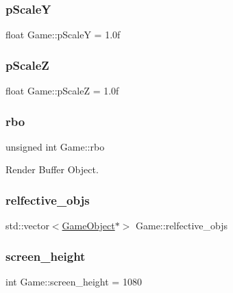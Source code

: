 \subsubsection{\texorpdfstring{pScaleY}{pScaleY}}
{\footnotesize\ttfamily float Game\+::p\+ScaleY = 1.\+0f}

\mbox{\label{class_game_a049182cd8a977e566235e10855418a82}} 
\subsubsection{\texorpdfstring{pScaleZ}{pScaleZ}}
{\footnotesize\ttfamily float Game\+::p\+ScaleZ = 1.\+0f}

\mbox{\label{class_game_a521e6ba079b5beb2d552137f9363e36e}} 
\subsubsection{\texorpdfstring{rbo}{rbo}}
{\footnotesize\ttfamily unsigned int Game\+::rbo\hspace{0.3cm}{\ttfamily [protected]}}



Render Buffer Object. 

\mbox{\label{class_game_aeb28e11f6ddb7c1226a42e59c1d7817b}} 
\subsubsection{\texorpdfstring{relfective\_objs}{relfective\_objs}}
{\footnotesize\ttfamily std\+::vector$<$\mbox{\hyperlink{class_game_object}{Game\+Object}}$\ast$$>$ Game\+::relfective\+\_\+objs}

\mbox{\label{class_game_ab52e2343e6335e426a6395c44f4dab71}} 
\subsubsection{\texorpdfstring{screen\_height}{screen\_height}}
{\footnotesize\ttfamily int Game\+::screen\+\_\+height = 1080\hspace{0.3cm}{\ttfamily [protected]}}



